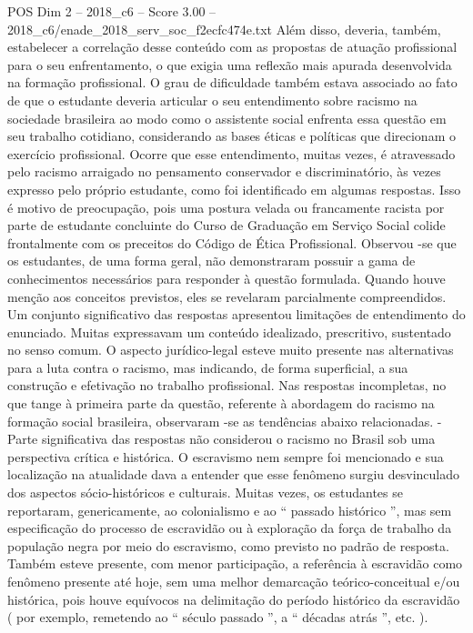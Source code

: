 \begin{textsample}{POS Dim 2 – 2018\_c6 – Score 3.00 – 2018\_c6/enade\_2018\_serv\_soc\_f2ecfc474e.txt}
Além disso, deveria, também, estabelecer a correlação desse conteúdo com as propostas de atuação profissional para o seu enfrentamento, o que exigia uma reflexão mais apurada desenvolvida na formação profissional.
O grau de dificuldade também estava associado ao fato de que o estudante deveria articular o seu entendimento sobre racismo na sociedade brasileira ao modo como o assistente social enfrenta essa questão em seu trabalho cotidiano, considerando as bases éticas e políticas que direcionam o exercício profissional.
Ocorre que esse entendimento, muitas vezes, é atravessado pelo racismo arraigado no pensamento conservador e discriminatório, às vezes expresso pelo próprio estudante, como foi identificado em algumas respostas.
Isso é motivo de preocupação, pois uma postura velada ou francamente racista por parte de estudante concluinte do Curso de Graduação em Serviço Social colide frontalmente com os preceitos do Código de Ética Profissional.
Observou -se que os estudantes, de uma forma geral, não demonstraram possuir a gama de conhecimentos necessários para responder à questão formulada.
Quando houve menção aos conceitos previstos, eles se revelaram parcialmente compreendidos.
Um conjunto significativo das respostas apresentou limitações de entendimento do enunciado.
Muitas expressavam um conteúdo idealizado, prescritivo, sustentado no senso comum.
O aspecto jurídico-legal esteve muito presente nas alternativas para a luta contra o racismo, mas indicando, de forma superficial, a sua construção e efetivação no trabalho profissional.
Nas respostas incompletas, no que tange à primeira parte da questão, referente à abordagem do racismo na formação social brasileira, observaram -se as tendências abaixo relacionadas. - Parte significativa das respostas não considerou o racismo no Brasil sob uma perspectiva crítica e histórica.
O escravismo nem sempre foi mencionado e sua localização na atualidade dava a entender que esse fenômeno surgiu desvinculado dos aspectos sócio-históricos e culturais.
Muitas vezes, os estudantes se reportaram, genericamente, ao colonialismo e ao “ passado histórico ”, mas sem especificação do processo de escravidão ou à exploração da força de trabalho da população negra por meio do escravismo, como previsto no padrão de resposta.
Também esteve presente, com menor participação, a referência à escravidão como fenômeno presente até hoje, sem uma melhor demarcação teórico-conceitual e/ou histórica, pois houve equívocos na delimitação do período histórico da escravidão ( por exemplo, remetendo ao “ século passado ”, a “ décadas atrás ”, etc. ).

\end{textsample}
